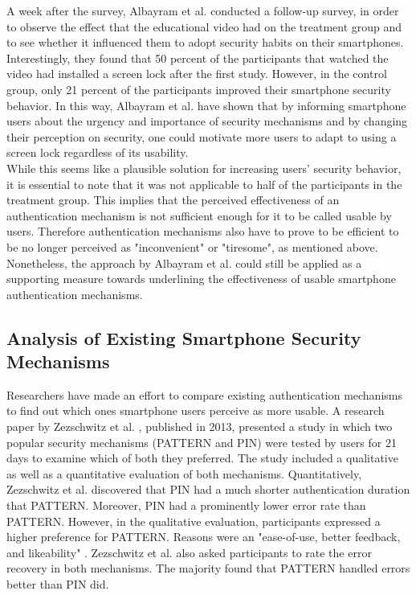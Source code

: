 A week after the survey, Albayram et al. \cite{Albayram:2017:BUL:3235924.3235929} conducted a follow-up survey, in order to observe the effect that the educational video had on the treatment group and to see whether it influenced them to adopt security habits on their smartphones. Interestingly, they found that 50 percent of the participants that watched the video had installed a screen lock after the first study. However, in the control group, only 21 percent of the participants improved their smartphone security behavior. In this way, Albayram et al. \cite{Albayram:2017:BUL:3235924.3235929} have shown that by informing smartphone users about the urgency and importance of security mechanisms and by changing their perception on security, one could motivate more users to adapt to using a screen lock regardless of its usability. \\

While this seems like a plausible solution for increasing users' security behavior, it is essential to note that it was not applicable to half of the participants in the treatment group. This implies that the perceived effectiveness of an authentication mechanism is not sufficient enough for it to be called usable by users. Therefore authentication mechanisms also have to prove to be efficient to be no longer perceived as "inconvenient" or "tiresome", as mentioned above. Nonetheless, the approach by Albayram et al. \cite{Albayram:2017:BUL:3235924.3235929} could still be applied as a supporting measure towards underlining the effectiveness of usable smartphone authentication mechanisms. 

\subsection{Analysis of Existing Smartphone Security Mechanisms} \label{2.2.2}

Researchers have made an effort to compare existing authentication mechanisms to find out which ones smartphone users perceive as more usable. A research paper by Zezschwitz et al. \cite{PatternWild}, published in 2013, presented a study in which two popular security mechanisms (PATTERN and PIN) were tested by users for 21 days to examine which of both they preferred. The study included a qualitative as well as a quantitative evaluation of both mechanisms. Quantitatively, Zezschwitz et al. \cite{PatternWild} discovered that PIN had a much shorter authentication duration that PATTERN. Moreover, PIN had a prominently lower error rate than PATTERN. However, in the qualitative evaluation, participants expressed a higher preference for PATTERN. Reasons were an "ease-of-use, better feedback, and likeability" \cite{PatternWild}. Zezschwitz et al. \cite{PatternWild} also asked participants to rate the error recovery in both mechanisms. The majority found that PATTERN handled errors better than PIN did.\\

